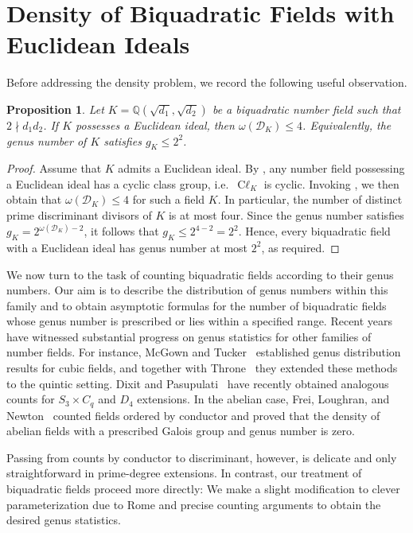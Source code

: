 \documentclass[12 pt]{amsart}
\newcommand\cD{{\mathcal{D}}}
\newcommand{\Q}{\mathbb{Q}}
\newtheorem{prop}[thm]{Proposition}
\theoremstyle{definition}
\theoremstyle{remark}
\DeclareMathOperator{\Cl}{C\ell}
\begin{document}
\section{Density of Biquadratic Fields with Euclidean Ideals}

Before addressing the density problem, we record the following useful observation.

\begin{prop}
Let $K=\Q(\sqrt{d_1}, \sqrt{d_2})$ be a biquadratic number field such that $2\nmid d_1 d_2$.
If $K$ possesses a Euclidean ideal, then $\omega(\cD_K)\le4$.
Equivalently, the genus number of $K$ satisfies $g_K\le 2^2$.
\end{prop}

\begin{proof}
Assume that $K$ admits a Euclidean ideal.  
By \cite[Theorem~1.6]{Len79}, any number field possessing a Euclidean ideal has a cyclic class group, i.e.\ $\Cl_K$ is cyclic.  
Invoking , we then obtain that $\omega(\cD_K)\le4$ for such a field $K$. 
In particular, the number of distinct prime discriminant divisors of $K$ is at most four.
Since the genus number satisfies $g_K = 2^{\omega(\cD_K)-2}$, it follows that $g_K \le 2^{4-2} = 2^2 $. Hence, every biquadratic field with a Euclidean ideal has genus number at most $2^2$, as required.
\end{proof}

\noindent
We now turn to the task of counting biquadratic fields according to their
genus numbers. Our aim is to describe the distribution of genus numbers
within this family and to obtain asymptotic formulas for the number of
biquadratic fields whose genus number is prescribed or lies within a specified range.
Recent years have witnessed substantial progress on genus statistics for other
families of number fields. For instance, McGown and Tucker~\cite{McTu23}
established genus distribution results for cubic fields, and together with
Throne~\cite{MTT23} they extended these methods to the quintic setting.
Dixit and Pasupulati~\cite{DiPa26} have recently obtained analogous counts
for $S_3\times C_q$ and $D_4$ extensions. In the abelian case, Frei, Loughran,
and Newton~\cite{FLR23} counted fields ordered by conductor and proved that
the density of abelian fields with a prescribed Galois group and genus number
is zero.

Passing from  counts by conductor to discriminant, however, is delicate and only
straightforward in prime-degree extensions. In contrast, our treatment of
biquadratic fields proceed more directly: We make a slight modification to clever 
parameterization due to Rome\cite{Rom18} and precise counting arguments to obtain the desired genus
statistics.
\end{document}
